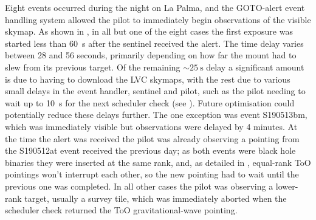 \begin{colsection}
\begin{colsection}
Eight events occurred during the night on La Palma, and the GOTO-alert event handling system allowed the pilot to immediately begin observations of the visible skymap. As shown in , in all but one of the eight cases the first exposure was started less than \SI{60}{\second} after the sentinel received the alert. The time delay varies between 28 and 56 seconds, primarily depending on how far the mount had to slew from its previous target. Of the remaining $\sim\SI{25}{\second}$ delay a significant amount is due to having to download the LVC skymaps, with the rest due to various small delays in the event handler, sentinel and pilot, such as the pilot needing to wait up to \SI{10}{\second} for the next scheduler check (see ). Future optimisation could potentially reduce these delays further. The one exception was event S190513bm, which was immediately visible but observations were delayed by 4 minutes. At the time the alert was received the pilot was already observing a pointing from the S190512at event received the previous day; as both events were black hole binaries they were inserted at the same rank, and, as detailed in , equal-rank ToO pointings won't interrupt each other, so the new pointing had to wait until the previous one was completed. In all other cases the pilot was observing a lower-rank target, usually a survey tile, which was immediately aborted when the scheduler check returned the ToO gravitational-wave pointing.


\end{colsection}
\end{colsection}
